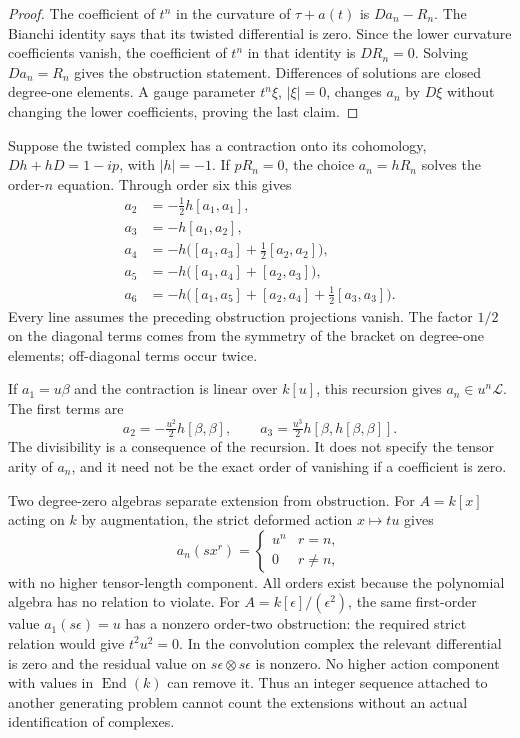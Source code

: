\begin{proof}
The coefficient of $t^n$ in the curvature of $\tau+a(t)$ is
$Da_n-R_n$.  The Bianchi identity says that its twisted differential is
zero.  Since the lower curvature coefficients vanish, the coefficient
of $t^n$ in that identity is $DR_n=0$.  Solving $Da_n=R_n$ gives the
obstruction statement.  Differences of solutions are closed degree-one
elements.  A gauge parameter $t^n\xi$, $|\xi|=0$, changes $a_n$ by
$D\xi$ without changing the lower coefficients, proving the last claim.
\end{proof}

Suppose the twisted complex has a contraction onto its cohomology,
$Dh+hD=1-ip$, with $|h|=-1$.  If $pR_n=0$, the choice $a_n=hR_n$
solves the order-$n$ equation.  Through order six this gives
\begin{equation}\label{cyquant:eq:six-orders}
 \begin{aligned}
 a_2&=-\tfrac12h[a_1,a_1],\\
 a_3&=-h[a_1,a_2],\\
 a_4&=-h\bigl([a_1,a_3]+\tfrac12[a_2,a_2]\bigr),\\
 a_5&=-h\bigl([a_1,a_4]+[a_2,a_3]\bigr),\\
 a_6&=-h\bigl([a_1,a_5]+[a_2,a_4]+\tfrac12[a_3,a_3]\bigr).
 \end{aligned}
\end{equation}
Every line assumes the preceding obstruction projections vanish.  The
factor $1/2$ on the diagonal terms comes from the symmetry of the bracket
on degree-one elements; off-diagonal terms occur twice.

If $a_1=u\beta$ and the contraction is linear over $k[u]$, this recursion
gives $a_n\in u^n\mathcal L$.  The first terms are
\[
 a_2=-\tfrac{u^2}{2}h[\beta,\beta],\qquad
 a_3=\tfrac{u^3}{2}h[\beta,h[\beta,\beta]].
\]
The divisibility is a consequence of the recursion.  It does not specify
the tensor arity of $a_n$, and it need not be the exact order of
vanishing if a coefficient is zero.

Two degree-zero algebras separate extension from obstruction.  For
$A=k[x]$ acting on $k$ by augmentation, the strict deformed action
$x\mapsto tu$ gives
\[
 a_n(sx^r)=\begin{cases}u^n&r=n,\\0&r\ne n,\end{cases}
\]
with no higher tensor-length component.  All orders exist because the
polynomial algebra has no relation to violate.  For
$A=k[\epsilon]/(\epsilon^2)$, the same first-order value
$a_1(s\epsilon)=u$ has a nonzero order-two obstruction: the required
strict relation would give $t^2u^2=0$.  In the convolution complex the
relevant differential is zero and the residual value on
$s\epsilon\otimes s\epsilon$ is nonzero.  No higher action component
with values in $\operatorname{End}(k)$ can remove it.  Thus an
integer sequence attached to another generating problem cannot count
the extensions without an actual identification of complexes.

